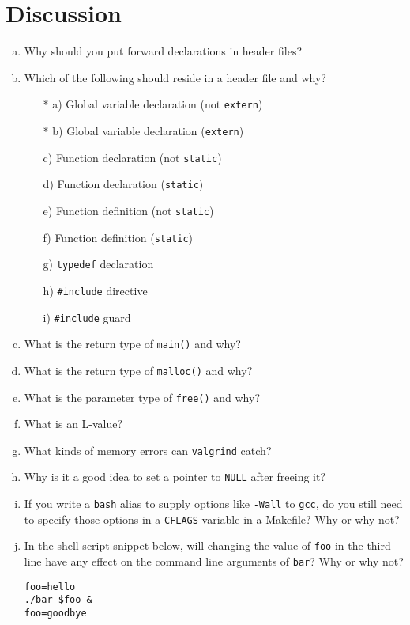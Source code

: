 \documentclass[a4paper,12pt]{article}
\begin{document}
\newpage

\section{Discussion}

\begin{enumerate}[a)]
	\item Why should you put forward declarations in header files?
	\item Which of the following should reside in a header file and
	      why?
	\begin{enumerate}[i)]
		\item[* a)] Global variable declaration
		      (not \texttt{extern})
		\item[* b)] Global variable declaration
		      (\texttt{extern})
		\item[c)] Function declaration (not \texttt{static})
		\item[d)] Function declaration (\texttt{static})
		\item[e)] Function definition (not \texttt{static})
		\item[f)] Function definition (\texttt{static})
		\item[g)] \texttt{typedef} declaration
		\item[h)] \texttt{\#include} directive
		\item[i)] \texttt{\#include} guard
	\end{enumerate}
	\item What is the return type of \texttt{main()} and why?
	\item What is the return type of \texttt{malloc()} and why?
	\item What is the parameter type of \texttt{free()} and why?
	\item What is an L-value?
	\item What kinds of memory errors can \texttt{valgrind} catch?
	\item Why is it a good idea to set a pointer to \texttt{NULL}
	      after freeing it?
	\item If you write a \texttt{bash} alias to supply options like
	      \texttt{-Wall} to \texttt{gcc}, do you still need to
	      specify those options in a \texttt{CFLAGS} variable in a
	      Makefile? Why or why not?
	\item In the shell script snippet below, will changing the
	      value of \texttt{foo} in the third line have any effect
	      on the command line arguments of \texttt{bar}? Why or why
	      not?
	\begin{lstlisting}
foo=hello
./bar $foo &
foo=goodbye
	\end{lstlisting}
\end{enumerate}
\end{document}
